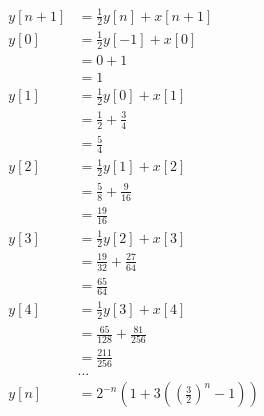 \documentclass[10pt,a4paper, margin=1in]{article}
\begin{document}
\begin{enumerate}
\begin{enumerate}
\begin{align*}
        y[n + 1] &= \frac{1}{2}y[n] + x[n + 1] \\
        y[0] &= \frac{1}{2}y[-1] + x[0] \\
        &= 0 + 1 \\
        &= 1 \\
        y[1] &= \frac{1}{2}y[0] + x[1] \\
        &= \frac{1}{2} + \frac{3}{4} \\
        &= \frac{5}{4} \\
        y[2] &= \frac{1}{2}y[1] + x[2] \\
        &= \frac{5}{8} + \frac{9}{16} \\
        &= \frac{19}{16} \\
        y[3] &= \frac{1}{2}y[2] + x[3] \\
        &= \frac{19}{32} + \frac{27}{64} \\
        &= \frac{65}{64} \\
        y[4] &= \frac{1}{2}y[3] + x[4] \\
        &= \frac{65}{128} + \frac{81}{256} \\
        &= \frac{211}{256} \\
        &...\\
        y[n] &= 2^{-n}\left(1 + 3\left( \left(\frac{3}{2}\right)^n - 1 \right)\right)
    \end{align*}
    \end{enumerate}


\end{enumerate}
\end{document}
